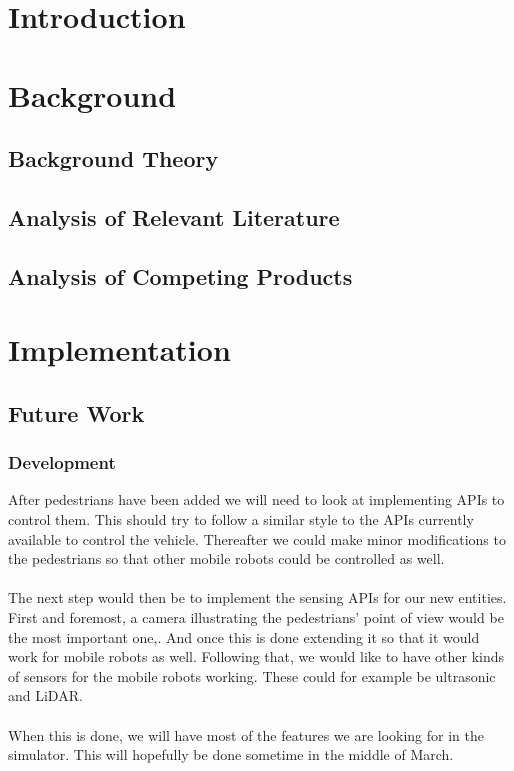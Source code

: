 \documentclass[12pt,oneside]{report}
\begin{document}


\tableofcontents
\newpage

\chapter{Introduction}



\chapter{Background}

\section{Background Theory}


\section{Analysis of Relevant Literature} \label{BackgroundLit}


\section{Analysis of Competing Products} \label{AoCP}




\chapter{Implementation}

\section{Future Work} \label{FuturePlanning}
\subsection{Development}
After pedestrians have been added we will need to look at implementing APIs to control them. This should try to follow a similar style to the APIs currently available to control the vehicle. Thereafter we could make minor modifications to the pedestrians so that other mobile robots could be controlled as well. 
\\~\\
The next step would then be to implement the sensing APIs for our new entities. First and foremost, a camera illustrating the pedestrians' point of view would be the most important one,. And once this is done extending it so that it would work for mobile robots as well. 
Following that, we would like to have other kinds of sensors for the mobile robots working. These could for example be ultrasonic and LiDAR. 
\\~\\
When this is done, we will have most of the features we are looking for in the simulator. This will hopefully be done sometime in the middle of March.
\end{document}
